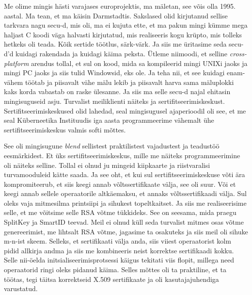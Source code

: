 Me olime mingis hästi varajases europrojektis, ma mäletan, see võis olla 1995. 
aastal. Ma tean, et ma käisin Darmstadtis. Sakslased olid 
kirjutanud sellise tarkvara nagu secu-d, mis oli,  ma ei kujuta ette, et ma 
pakun mingi kümme mega haljast C koodi väga halvasti kirjutatud, mis  
realiseeris kogu krüpto, mis tolleks hetkeks oli teada. Kõik sertide töötlus, 
särk-värk. Ja siis me üritasime seda secu-d'd kuidagi rakendada ja kuidagi 
käima peksta. Ütleme niimoodi, et selline \emph{cross-platform} arendus tollal, 
et sul on kood, mida sa kompileerid mingi UNIXi jaoks ja mingi PC jaoks ja siis 
tulid Windowsid, eks ole. Ja teha nii, et see kuidagi enam-vähem  töötab ja 
piisavalt vähe mälu lekib ja piisavalt harva sama mäluplokki kaks korda 
vabastab on  raske ülesanne. Ja siis ma selle secu-d najal ehitasin 
mingisuguseid asju. Turvalist meiliklienti näiteks ja sertifitseerimiskeskust. 
Sertifitseerimiskeskused olid lahedad,  seal mingisugusel  ajaperioodil oli 
see, et me seal Küberneetika Instituudis iga aasta programmeerime vähemalt ühe 
sertifitseerimiskeskus valmis softi mõttes.


See oli mingisugune \emph{blend} sellistest praktilistest vajadustest ja 
teadustöö eesmärkidest. Et üks  sertifitseerimiskeskus, mille me näiteks 
programmeerimine oli näiteks selline. Tollal ei olnud ju mingeid kiipkaarte ja 
riistvaralisi turvamooduleid kätte saada. Ja see oht, et kui sul 
sertifitseerimiskeskuse võti ära 
 kompromiteerub, et siis keegi annab võltssertifikaate välja, see oli suur. Või 
et keegi annab sellele operaatorile altkäemaksu, et annaks võltssertifikaadi 
välja. Sul oleks vaja mitmesilma printsiipi ja sihukest  topeltkaitset. Ja siis 
me realiseerisime selle, et me võitsime selle RSA võtme tükkideks. See on 
seesama, mida praegu SplitKey ja SmartID teevad. 
Meil ei olnud küll seda turvalist mitmes osas võtme genereerimist, me lihtsalt 
RSA võtme, jagasime ta osakuteks ja siis meil oli sihuke m-n-ist skeem. 
Selleks, et sertifikaati välja anda, siis viiest operaatorist kolm pidid  
allkirja andma ja siis me kombineeris neist korrektse sertifikaadi kokku. Selle 
nii-öelda initsialiseerimisprotsessi käigus tekitati viis flopit,  millega need 
 operaatorid ringi oleks pidanud käima. Selles mõttes oli ta praktiline, et ta 
töötas,  tegi täitsa korrektseid X.509  sertifikaate ja oli kasutajajuhendiga 
varustatud.  
 

